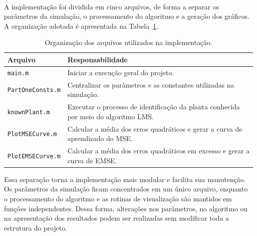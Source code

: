 \documentclass[11pt,a4paper,oneside]{report}
\renewcommand{\arraystretch}{1.18}
\begin{document}
\paragraph{} A implementação foi dividida em cinco arquivos, de forma a separar os
parâmetros da simulação, o processamento do algoritmo e a geração dos
gráficos. A organização adotada é apresentada na
Tabela~\ref{tab:organizacao-arquivos}.

\begin{table}[H]
    \centering
    \caption{Organização dos arquivos utilizados na implementação.}
    \label{tab:organizacao-arquivos}

    \small
    \setlength{\tabcolsep}{6pt}
    \renewcommand{\arraystretch}{1.25}

    \begin{tabular}{
        @{}
        >{\raggedright\arraybackslash}p{}
        >{\raggedright\arraybackslash}p{}
        @{}
    }
        \toprule
        \textbf{Arquivo} & \textbf{Responsabilidade} \\
        \midrule

        \texttt{main.m}
        &
        Iniciar a execução geral do projeto.
        \\

        \texttt{PartOneConsts.m}
        &
        Centralizar os parâmetros e as constantes utilizadas na simulação.
        \\

        \texttt{knownPlant.m}
        &
        Executar o processo de identificação da planta conhecida por meio
        do algoritmo LMS.
        \\

        \texttt{PlotMSECurve.m}
        &
        Calcular a média dos erros quadráticos e gerar a curva de
        aprendizado do MSE.
        \\

        \texttt{PlotEMSECurve.m}
        &
        Calcular a média dos erros quadráticos em excesso e gerar a curva
        de EMSE.
        \\

        \bottomrule
    \end{tabular}
\end{table}

Essa separação torna a implementação mais modular e facilita sua
manutenção. Os parâmetros da simulação ficam concentrados em um único
arquivo, enquanto o processamento do algoritmo e as rotinas de
visualização são mantidos em funções independentes. Dessa forma,
alterações nos parâmetros, no algoritmo ou na apresentação dos
resultados podem ser realizadas sem modificar toda a estrutura do
projeto.
\end{document}
